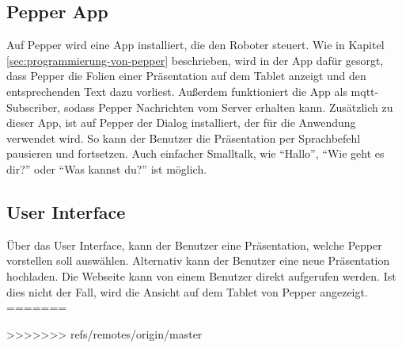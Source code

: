 \subsection{Pepper App}
Auf Pepper wird eine App installiert, die den Roboter steuert. Wie in Kapitel
\ref{sec:programmierung-von-pepper} beschrieben, wird in der App dafür gesorgt,
dass Pepper die Folien einer Präsentation auf dem Tablet anzeigt und den
entsprechenden Text dazu vorliest. Außerdem funktioniert die App als
\ac{mqtt}-Subscriber, sodass Pepper Nachrichten vom Server erhalten kann.
Zusätzlich zu dieser App, ist auf Pepper der Dialog installiert, der für die
Anwendung verwendet wird. So kann der Benutzer die Präsentation per Sprachbefehl
pausieren und fortsetzen. Auch einfacher Smalltalk, wie "`Hallo"', "`Wie geht es
dir?"' oder "`Was kannst du?"' ist möglich.

\subsection{User Interface}
Über das User Interface, kann der Benutzer eine Präsentation, welche Pepper
vorstellen soll auswählen. Alternativ kann der Benutzer eine neue Präsentation
hochladen. Die Webseite kann von einem Benutzer direkt aufgerufen werden. Ist
dies nicht der Fall, wird die Ansicht auf dem Tablet von Pepper angezeigt.
=======

>>>>>>> refs/remotes/origin/master
